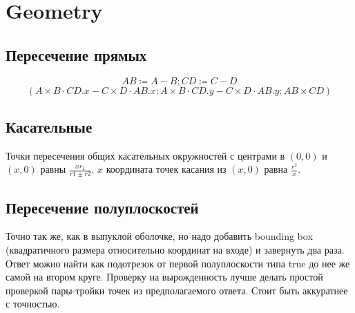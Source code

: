 \section{Geometry}

\subsection{Пересечение прямых}

\begin{equation*}
	AB \coloneqq A - B; CD \coloneqq C - D
\end{equation*}
\begin{equation*}
	(A \times B \cdot CD.x - C \times D \cdot AB.x : A \times B \cdot CD.y - C \times D \cdot AB.y : AB \times CD)
\end{equation*}

\subsection{Касательные}

Точки пересечения общих касательных окружностей с центрами в $(0, 0)$ и $(x, 0)$ равны $\frac{x r_1}{r1 \pm r2}$.
$x$ координата точек касания из $(x, 0)$ равна $\frac{r^2}{x}$.

\subsection{Пересечение полуплоскостей}

Точно так же, как в выпуклой оболочке, но надо добавить bounding box (квадратичного размера относительно координат на входе) и завернуть два раза.
Ответ можно найти как подотрезок от первой полуплоскости типа true до нее же самой на втором круге.
Проверку на вырожденность лучше делать простой проверкой пары-тройки точек из предполагаемого ответа. Стоит быть аккуратнее с точностью.

\inputminted{cpp}{code/halfplanes.cpp}

